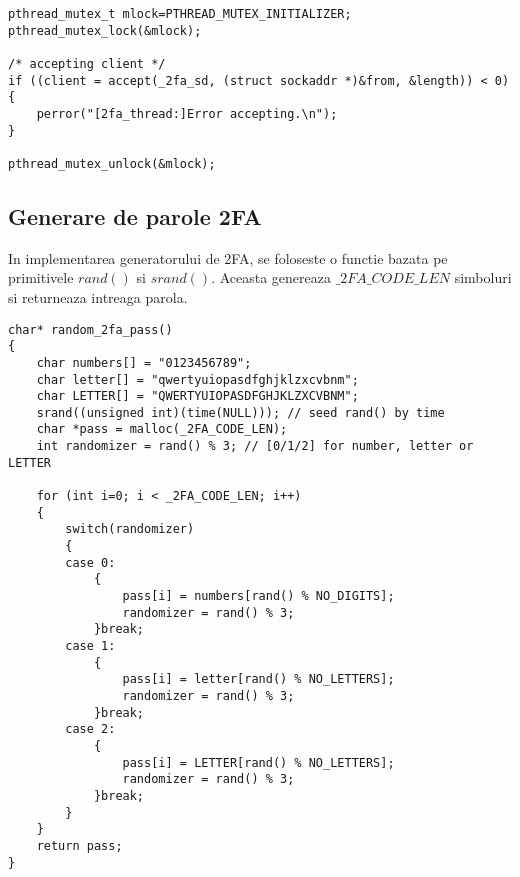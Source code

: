\documentclass{article}
\begin{document}
	\begin{tcolorbox}[colback=green!5,colframe=green!40!black,width = \linewidth, title = Folosire mutex pentru protejarea acceptului]
		\begin{Verbatim}[tabsize=4]
pthread_mutex_t mlock=PTHREAD_MUTEX_INITIALIZER;
pthread_mutex_lock(&mlock);

/* accepting client */
if ((client = accept(_2fa_sd, (struct sockaddr *)&from, &length)) < 0)
{
	perror("[2fa_thread:]Error accepting.\n");
}

pthread_mutex_unlock(&mlock);
		\end{Verbatim}
	\end{tcolorbox} 
	 
	 \subsection{Generare de parole 2FA}
	 
	 In implementarea generatorului de 2FA, se foloseste o functie bazata pe primitivele $rand()$ si $srand()$. Aceasta genereaza $\_2FA\_CODE\_LEN$ simboluri si returneaza intreaga parola.
	 
\begin{tcolorbox}[colback=green!5,colframe=green!40!black,width = \linewidth, title = Generarea unui singur cod 2FA]
	\begin{Verbatim}[tabsize=4]
char* random_2fa_pass()
{
	char numbers[] = "0123456789";
	char letter[] = "qwertyuiopasdfghjklzxcvbnm";
	char LETTER[] = "QWERTYUIOPASDFGHJKLZXCVBNM";	
	srand((unsigned int)(time(NULL))); // seed rand() by time
	char *pass = malloc(_2FA_CODE_LEN);
	int randomizer = rand() % 3; // [0/1/2] for number, letter or LETTER
	
	for (int i=0; i < _2FA_CODE_LEN; i++)
	{
		switch(randomizer)
		{
		case 0:
			{
				pass[i] = numbers[rand() % NO_DIGITS];
				randomizer = rand() % 3;
			}break;
		case 1:
			{
				pass[i] = letter[rand() % NO_LETTERS];
				randomizer = rand() % 3;
			}break;	
		case 2:
			{
				pass[i] = LETTER[rand() % NO_LETTERS];
				randomizer = rand() % 3;
			}break;		
		}
	}
	return pass;
}
	\end{Verbatim}
\end{tcolorbox} 
	 
\end{document}
